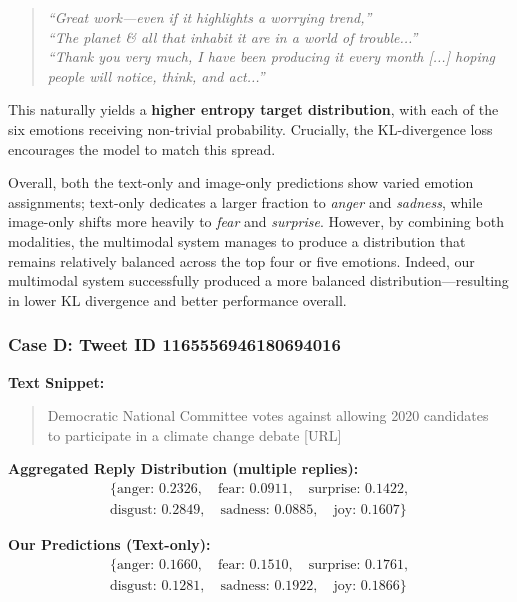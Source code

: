 \begin{quote}
\emph{``Great work—even if it highlights a worrying trend,''} \\
\emph{``The planet \& all that inhabit it are in a world of trouble...''} \\
\emph{``Thank you very much, I have been producing it every month [...] hoping people will notice, think, and act...''}
\end{quote}

This naturally yields a \textbf{higher entropy target distribution}, with each of the six emotions receiving non-trivial probability. Crucially, the KL-divergence loss encourages the model to match this spread. 
\newline

Overall, both the text-only and image-only predictions show varied emotion assignments; text-only dedicates a larger fraction to \textit{anger} and \textit{sadness}, while image-only shifts more heavily to \textit{fear} and \textit{surprise}. However, by combining both modalities, the multimodal system manages to produce a distribution that remains relatively balanced across the top four or five emotions. Indeed, our multimodal system successfully produced a more balanced distribution—resulting in lower KL divergence and better performance overall.

\subsubsection*{Case D: Tweet ID 1165556946180694016}

\noindent\textbf{Text Snippet:}
\begin{quote}
Democratic National Committee votes against allowing 2020 candidates \\
to participate in a climate change debate [URL]
\end{quote}

\noindent\textbf{Aggregated Reply Distribution (multiple replies):}
\[
\begin{aligned}
\{\text{anger: } 0.2326, \quad \text{fear: } 0.0911, \quad \text{surprise: } 0.1422, \\
\text{disgust: } 0.2849, \quad \text{sadness: } 0.0885, \quad \text{joy: } 0.1607\}
\end{aligned}
\]

\noindent\textbf{Our Predictions (Text-only):}
\[
\begin{aligned}
\{\text{anger: } 0.1660, \quad \text{fear: } 0.1510, \quad \text{surprise: } 0.1761, \\
\text{disgust: } 0.1281, \quad \text{sadness: } 0.1922, \quad \text{joy: } 0.1866\}
\end{aligned}
\]

